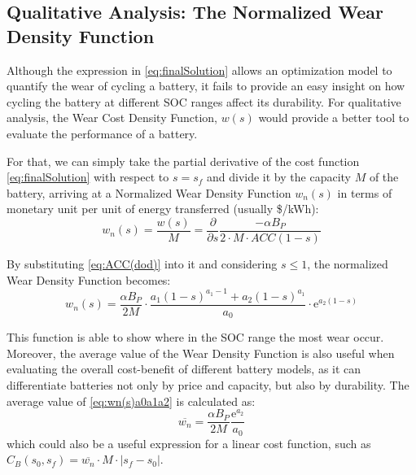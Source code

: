 \documentclass{ieeeaccess}
\begin{document}
    \subsection{Qualitative Analysis: The Normalized Wear Density Function}
    Although the expression in \eqref{eq:finalSolution} allows an optimization model to quantify the wear of cycling a battery, it fails to provide an easy insight on how cycling the battery at different \ac{SOC} ranges affect its durability. For qualitative analysis, the Wear Cost Density Function, $w(s)$ would provide a better tool to evaluate the performance of a battery.

    For that, we can simply take the partial derivative of the cost function \ref{eq:finalSolution} with respect to $s=s_f$ and divide it by the capacity $M$ of the battery, arriving at a Normalized Wear Density Function $w_n(s)$ in terms of monetary unit per unit of energy transferred (usually \$/kWh):
    \small
		$$ w_n(s) = \frac{w(s)}{M} = \frac{\partial}{\partial s} \frac{- \alpha B_P}{2 \cdot M \cdot ACC(1-s)} $$
	\normalsize

    By substituting \eqref{eq:ACC(dod)} into it and considering $ s \le 1 $, the normalized Wear Density Function becomes:
    \small
    \begin{equation}
        w_n(s) = \frac{\alpha B_P}{2M} \cdot \frac{a_1(1-s)^{a_1-1} + a_2(1-s)^{a_1}}{a_0} \cdot \mathrm{e}^{a_2(1-s)}
        \label{eq:wn(s)a0a1a2}
    \end{equation}
	\normalsize

	This function is able to show where in the \ac{SOC} range the most wear occur. Moreover, the average value of the Wear Density Function is also useful when evaluating the overall cost-benefit of different battery models, as it can differentiate batteries not only by price and capacity, but also by durability. The average value of \eqref{eq:wn(s)a0a1a2} is calculated as:
		$$ \overline{w_n} = \frac{\alpha B_P}{2M} \frac{\mathrm{e}^{a_2}}{a_0} $$
	which could also be a useful expression for a linear cost function, such as $C_B(s_0, s_f) = \overline{w_n}  \cdot M \cdot |s_f - s_0|$.
\end{document}
